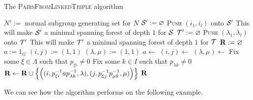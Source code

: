 \begin{algorithm}
\caption{The \textsc{PairsFromLinkedTriple} algorithm}
\label{alg:linked-triple-to-pairs}
\begin{algorithmic}[1]
    \State $N' := $ normal subgroup generating set for $N$
    \State $\mathcal{S}' := \varnothing$
        \State \textsc{Push} $(i_1, i_l)$ onto $\mathcal{S}'$
        \LComment This will make $\mathcal{S}'$ a minimal spanning forest of depth $1$ for $\mathcal{S}$
      \EndFor
    \EndFor
    \State $\mathcal{T}' := \varnothing$
        \State \textsc{Push} $(\lambda_1, \lambda_l)$ onto $\mathcal{T}'$
        \LComment This will make $\mathcal{T}'$ a minimal spanning forest of depth $1$ for $\mathcal{T}$
      \EndFor
    \EndFor
    \State $\mathbf{R} := \varnothing$
    \State $a := 1_G$
    \State $(i,j) := (1,1)$
    \State $(\lambda,\mu) := (1,1)$
        \State $a \gets$ 
      \EndIf
        \State $(i,j) \gets$ 
      \EndIf
        \State $(\lambda, \mu) \gets$ 
      \EndIf
      \State Fix some $\xi \in \Lambda$ such that $p_{\xi i} \neq 0$
      \State Fix some $k \in I$ such that $p_{\lambda k} \neq 0$
      \State $\mathbf{R} \gets \mathbf{R} \cup \left\{\left(
        (i, p_{\xi i}^{-1}ap_{\lambda k}^{-1}, \lambda),
        (j, p_{\xi j}^{-1}p_{\mu k}^{-1}, \mu)
        \right)\right\}$
    \EndWhile
    \State \Return $\mathbf{R}$
  \EndProcedure
\end{algorithmic}
\end{algorithm}

We can see how the algorithm performs on the following example.

